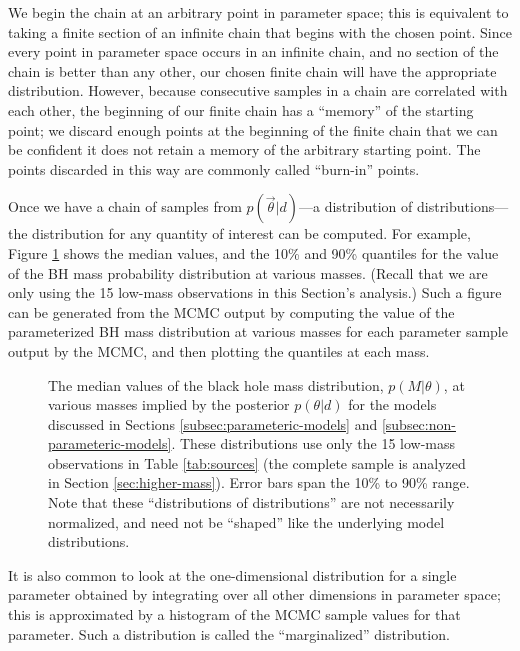 \documentclass[preprint]{aastex}
\newcommand{\vtheta}{\vec{\theta}}
\begin{document}
We begin the chain at an arbitrary point in parameter space; this is
equivalent to taking a finite section of an infinite chain that begins
with the chosen point.  Since every point in parameter space occurs in
an infinite chain, and no section of the chain is better than any
other, our chosen finite chain will have the appropriate distribution.
However, because consecutive samples in a chain are correlated with
each other, the beginning of our finite chain has a ``memory'' of the
starting point; we discard enough points at the beginning of the
finite chain that we can be confident it does not retain a memory of
the arbitrary starting point.  The points discarded in this way are
commonly called ``burn-in'' points.

Once we have a chain of samples from $p(\vtheta|d)$---a distribution
of distributions---the distribution for any quantity of interest can
be computed.  For example, Figure \ref{fig:dists} shows the median
values, and the 10\% and 90\% quantiles for the value of the BH mass
probability distribution at various masses.  (Recall that we are only
using the 15 low-mass observations in this Section's analysis.)  Such
a figure can be generated from the MCMC output by computing the value
of the parameterized BH mass distribution at various masses for each
parameter sample output by the MCMC, and then plotting the quantiles
at each mass.

\begin{figure}
  \begin{center}
  \end{center}
  \caption{\label{fig:dists} The median values of the black hole mass
    distribution, $p(M|\theta)$, at various masses implied by the
    posterior $p(\theta|d)$ for the models discussed in Sections
    \ref{subsec:parameteric-models} and
    \ref{subsec:non-parameteric-models}.  These distributions use only
    the 15 low-mass observations in Table \ref{tab:sources} (the
    complete sample is analyzed in Section \ref{sec:higher-mass}).
    Error bars span the 10\% to 90\% range.  Note that these
    ``distributions of distributions'' are not necessarily normalized,
    and need not be ``shaped'' like the underlying model
    distributions.}
\end{figure}

It is also common to look at the one-dimensional distribution for a
single parameter obtained by integrating over all other dimensions in
parameter space; this is approximated by a histogram of the MCMC
sample values for that parameter.  Such a distribution is called the
``marginalized'' distribution.
\end{document}

